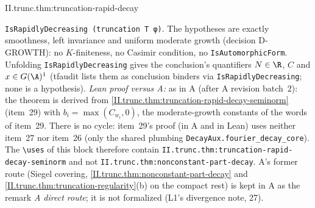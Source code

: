 \begin{tfformal}{II.trunc.thm:truncation-rapid-decay}
\begin{tffidelity}
\texttt{IsRapidlyDecreasing (truncation T φ)}. The hypotheses are exactly smoothness, left invariance and uniform moderate growth (decision D-GROWTH): no $K$-finiteness, no Casimir condition, no \texttt{IsAutomorphicForm}. Unfolding \texttt{IsRapidlyDecreasing} gives the conclusion's quantifiers $N\in\R$, $C$ and $x\in G(\A)^1$ (tfaudit lists them as conclusion binders via \texttt{IsRapidlyDecreasing}; none is a hypothesis). \emph{Lean proof versus A:} as in A (after A revision batch~2): the theorem is derived from \cref{II.trunc.thm:truncation-rapid-decay-seminorm} (item~29) with $b_i=\max(C_{w_i},0)$, the moderate-growth constants of the words of item~29. There is no cycle: item~29's proof (in A and in Lean) uses neither item~27 nor item~26 (only the shared plumbing \texttt{DecayAux.fourier\_decay\_core}). The \texttt{\textbackslash uses} of this block therefore contain \texttt{II.trunc.thm:truncation-rapid-decay-seminorm} and not \texttt{II.trunc.thm:nonconstant-part-decay}. A's former route (Siegel covering, \cref{II.trunc.thm:nonconstant-part-decay} and \cref{II.trunc.thm:truncation-regularity}(b) on the compact rest) is kept in A as the remark \emph{A direct route}; it is not formalized (L1's divergence note, 27).
\end{tffidelity}
\end{tfformal}
